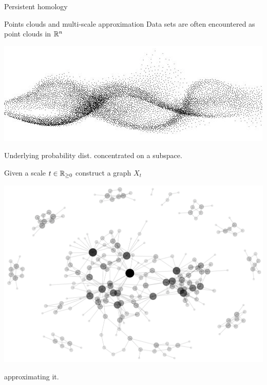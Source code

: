 
\begin{frame}
	\centering
	\vspace*{2.6cm}
	\Huge {}
	\vskip 20pt
	\Large Persistent homology
\end{frame}

\begin{frame}{Points clouds and multi-scale approximation}
	\pause
	Data sets are often encountered as point clouds in $\mathbb{R}^n$

	\pause
	\begin{center}
		\includegraphics[scale=.35]{aux/point_cloud_cropped}
	\end{center}

	\pause\vskip-3pt
	Underlying probability dist. concentrated on a subspace.
	\pause

	\pause\medskip
	Given a scale $t \in \mathbb{R}_{\geq 0}$ construct a graph $X_t$
	\begin{center}
		\vskip-3pt
		\includegraphics[scale=.09]{aux/network_cropped}
	\end{center}
	\vskip-6pt
	approximating it.
	\pause
\end{frame}

